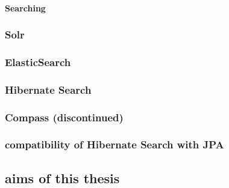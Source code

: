 \paragraph{Searching}

\subsubsection{Solr}

\subsubsection{ElasticSearch}

\subsubsection{Hibernate Search}

\subsubsection{Compass (discontinued)}

\subsubsection{compatibility of Hibernate Search with JPA}

\subsection{aims of this thesis}

